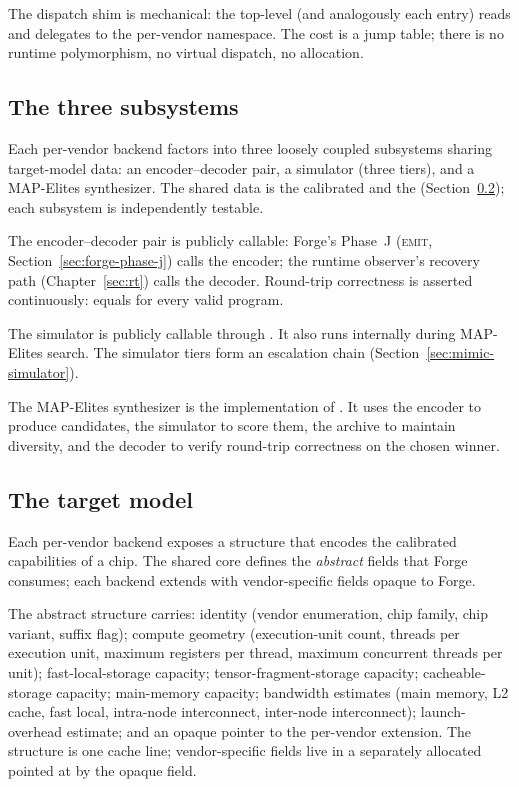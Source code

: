 The dispatch shim is mechanical: the top-level  (and analogously each entry) reads  and delegates to the per-vendor namespace.
The cost is a jump table; there is no runtime polymorphism, no virtual dispatch, no allocation.

\subsection{The three subsystems}
\label{sec:mimic-three-subsystems}

Each per-vendor backend factors into three loosely coupled subsystems sharing target-model data: an encoder--decoder pair, a simulator (three tiers), and a MAP-Elites synthesizer.
The shared data is the calibrated  and the  (Section~\ref{sec:mimic-target-model}); each subsystem is independently testable.

The encoder--decoder pair is publicly callable: Forge's Phase~J (\textsc{emit}, Section~\ref{sec:forge-phase-j}) calls the encoder; the runtime observer's recovery path (Chapter~\ref{sec:rt}) calls the decoder.
Round-trip correctness is asserted continuously:  equals  for every valid  program.

The simulator is publicly callable through .
It also runs internally during MAP-Elites search.
The simulator tiers form an escalation chain (Section~\ref{sec:mimic-simulator}).

The MAP-Elites synthesizer is the implementation of .
It uses the encoder to produce candidates, the simulator to score them, the archive to maintain diversity, and the decoder to verify round-trip correctness on the chosen winner.

\subsection{The target model}
\label{sec:mimic-target-model}

Each per-vendor backend exposes a  structure that encodes the calibrated capabilities of a chip.
The shared core defines the \emph{abstract} fields that Forge consumes; each backend extends with vendor-specific fields opaque to Forge.

\begin{definition}
\label{def:mimic-targetcaps}
The abstract  structure carries: identity (vendor enumeration, chip family, chip variant, suffix flag); compute geometry (execution-unit count, threads per execution unit, maximum registers per thread, maximum concurrent threads per unit); fast-local-storage capacity; tensor-fragment-storage capacity; cacheable-storage capacity; main-memory capacity; bandwidth estimates (main memory, L2 cache, fast local, intra-node interconnect, inter-node interconnect); launch-overhead estimate; and an opaque pointer to the per-vendor extension.
The structure is one cache line; vendor-specific fields live in a separately allocated  pointed at by the opaque field.
\end{definition}

